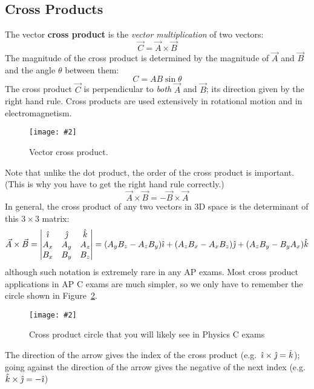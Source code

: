 \documentclass{../../oss-handout}
\newcommand{\iii}{\ensuremath\hat\imath}
\newcommand{\jjj}{\ensuremath\hat\jmath}
\newcommand{\kkk}{\ensuremath{\hat k}}
\newcommand{\pic}[2]{\texttt{[image: \#2]}}
\begin{document}
\subsection{Cross Products}
The vector \textbf{cross product} is the \emph{vector multiplication} of two
vectors:
\begin{equation*}
  \vec C=\vec A\times\vec B
\end{equation*}
The magnitude of the cross product is determined by the magnitude of $\vec A$
and $\vec B$ and the angle $\theta$ between them:
\begin{equation*}
  C=AB\sin\theta
\end{equation*}
The cross product $\vec C$ is perpendicular to \emph{both} $\vec A$ and
$\vec B$; its direction given by the right hand rule. Cross products are used
extensively in rotational motion and in electromagnetism.
\begin{figure}[ht]
  \centering
  \pic{.3}{cross-product.png}
  \caption{Vector cross product.}
  \label{fig:cross1}
\end{figure}
Note that unlike the dot product, the order of the cross product is important.
(This is why you have to get the right hand rule correctly.)
\begin{equation*}
  \vec A\times\vec B=-\vec B\times\vec A
\end{equation*}
In general, the cross product of any two vectors in 3D space is the determinant
of this $3\times 3$ matrix:
\begin{equation*}
  \vec A\times\vec B=
  \left|
  \begin{matrix}
    \iii & \jjj & \kkk \\
    A_x & A_y & A_z\\
    B_x & B_y & B_z
  \end{matrix}
  \right|
  =(A_yB_z-A_zB_y)\iii +
  (A_zB_x-A_xB_z)\jjj +
  (A_zB_y-B_yA_x)\kkk
\end{equation*}
although such notation is extremely rare in any AP exams. Most cross product
applications in AP C exams are much simpler, so we
only have to remember the circle shown in Figure~\ref{fig:cross2}.
\begin{figure}[ht]
  \centering
  \pic{.12}{cross-product-circle}
  \caption{Cross product circle that you will likely see in Physics C exams}
  \label{fig:cross2}
\end{figure}

The direction of the arrow gives the index of the cross product (e.g.\
$\iii\times\jjj=\kkk$); going against the direction of the arrow gives the
negative of the next index (e.g.\ $\kkk\times\jjj=-\iii$)
\end{document}
